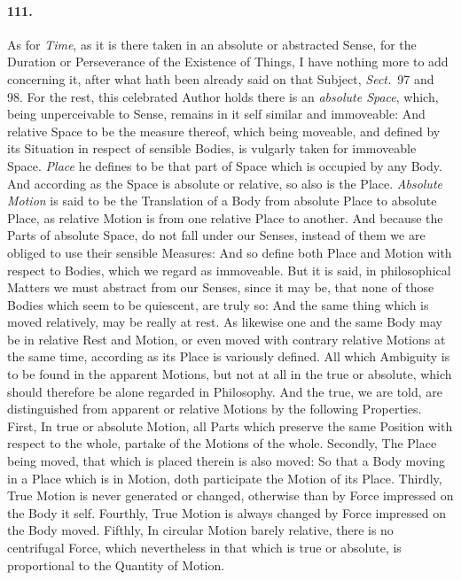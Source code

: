 \documentclass[]{article}
\newenvironment{sectionbody}{\begin{multicols}{2}}{\end{multicols}}
\begin{document}
\begin{sectionbody}
\paragraph{111.} As for \emph{Time}, as it is there taken in an absolute or
abstracted Sense, for the Duration or Perseverance of the
Existence of Things, I have nothing more to add concerning it,
after what hath been already said on that Subject,
\emph{Sect.}\ 97 and 98.
For the rest, this celebrated Author holds there is an
\emph{absolute Space}, which, being unperceivable to Sense,
remains in it self similar and immoveable: And relative Space to
be the measure thereof, which being moveable, and defined by its
Situation in respect of sensible Bodies, is vulgarly taken for
immoveable Space.  \emph{Place} he defines to be that part of
Space which is occupied by any Body.  And according as the Space
is absolute or relative, so also is the Place.  \emph{Absolute
Motion} is said to be the Translation of a Body from absolute
Place to absolute Place, as relative Motion is from one relative
Place to another.  And because the Parts of absolute Space, do
not fall under our Senses, instead of them we are obliged to use
their sensible Measures: And so define both Place and Motion with
respect to Bodies, which we regard as immoveable.  But it is
said, in philosophical Matters we must abstract from our Senses,
since it may be, that none of those Bodies which seem to be
quiescent, are truly so: And the same thing which is moved
relatively, may be really at rest.  As likewise one and the same
Body may be in relative Rest and Motion, or even moved with
contrary relative Motions at the same time, according as its
Place is variously defined.  All which Ambiguity is to be found
in the apparent Motions, but not at all in the true or absolute,
which should therefore be alone regarded in Philosophy.  And the
true, we are told, are distinguished from apparent or relative
Motions by the following Properties.  First, In true or absolute
Motion, all Parts which preserve the same Position with respect
to the whole, partake of the Motions of the whole.  Secondly, The
Place being moved, that which is placed therein is also moved: So
that a Body moving in a Place which is in Motion, doth
participate the Motion of its Place.  Thirdly, True Motion is
never generated or changed, otherwise than by Force impressed on
the Body it self.  Fourthly, True Motion is always changed by
Force impressed on the Body moved.  Fifthly, In circular Motion
barely relative, there is no centrifugal Force, which
nevertheless in that which is true or absolute, is proportional
to the Quantity of Motion.




\end{sectionbody}
\end{document}
